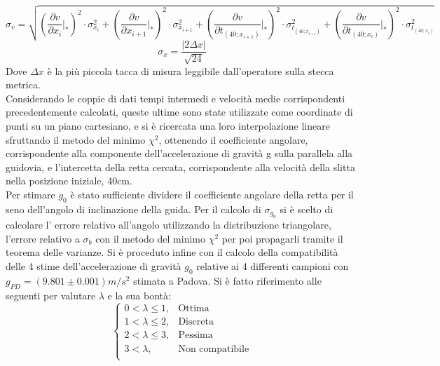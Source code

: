 \documentclass[a4paper,11pt,oneside]{article}
\begin{document}
\begin{equation*}\label{eq:propagazione_velocità}
    \sigma_{v}= \sqrt{
   \left( {\frac{\partial v}{\partial x_{i}}} \Big|_{\ast}\right)^{2} \cdot \sigma_{x_{i}}^2  +   
   \left( {\frac{\partial v}{\partial x_{i+1}}}\Big|_{\ast}\right )^{2} \cdot \sigma_{x_{i+1}}^2   +   
   \left( {\frac{\partial v}{\partial t_{\left(40; x_{i+1}\right)}}}\Big|_{\ast}\right)^{2}  \cdot \sigma_{t_{\left(40; x_{i+1}\right)}}^2 +   
       \left( {\frac{\partial v}{\partial t_{\left(40; x_i\right)}}}\Big|_{\ast}\right)^{2} \cdot  \sigma_{t_{\left(40; x_i\right)}}^2
    }
\end{equation*}
\begin{equation*}%
\sigma_{x}=\frac{\mathopen|2\Delta x\mathclose|}{\sqrt{24}} 
\end{equation*}
Dove $\Delta x$ è la più piccola tacca di misura leggibile dall'operatore sulla stecca metrica.\\
Considerando le coppie di dati tempi intermedi e velocità medie corrispondenti precedentemente calcolati, queste ultime sono state utilizzate come coordinate di punti su un piano cartesiano, e si è ricercata una loro interpolazione lineare sfruttando il metodo del minimo ${\chi}^2$, ottenendo il coefficiente angolare, corrispondente alla componente dell'accelerazione di gravità g sulla parallela  alla guidovia, e l'intercetta della retta cercata, corrispondente alla velocità della slitta nella posizione iniziale, 40cm.\\
Per stimare $g_{0}$ è stato sufficiente dividere il coefficiente angolare della retta per il seno dell'angolo di inclinazione della guida.
Per il calcolo di $ \sigma_{g_{0}}$ si è scelto di calcolare l' errore relativo all'angolo utilizzando la distribuzione triangolare, l'errore relativo a $\sigma_b$ con il metodo del minimo ${\chi}^2$ per poi propagarli tramite il teorema delle varianze. Si è proceduto infine con il calcolo della compatibilità delle 4 stime dell'accelerazione di gravità $g_{0}$ relative ai 4 differenti campioni con $g_{PD}=(9.801\pm 0.001)\si{m/s^2}$ stimata a Padova. Si è fatto riferimento alle seguenti per valutare  $\lambda$ e la sua bontà:
\begin{equation*}%
    \label{eq:cases}
    \begin{cases}
    0<\lambda\leq 1, & \text{Ottima}\\
    1<\lambda\leq2, & \text{Discreta}\\
    2<\lambda\leq3, & \text{Pessima}\\
    3<\lambda, & \text{Non compatibile}\\
    \end{cases}
\end{equation*}
\end{document}
